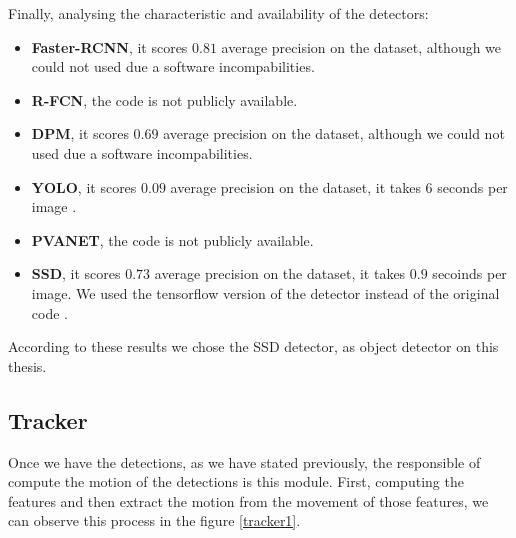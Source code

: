 \documentclass[12pt, a4paper, titlepage,twoside,openright]{article}
\begin{document}

Finally, analysing the characteristic and availability of the detectors:

\begin{itemize}

\item \textbf{Faster-RCNN}, it scores $0.81$ average precision on the dataset, although we could not used due a software incompabilities.

\item \textbf{R-FCN}, the code is not publicly available.

\item \textbf{DPM}, it scores $0.69$ average precision on the dataset, although we could not used due a software incompabilities.

\item \textbf{YOLO}, it scores $0.09$ average precision on the dataset, it takes $6$ seconds per image \cite{yoloDark}. 

\item \textbf{PVANET}, the code is not publicly available.

\item \textbf{SSD}, it scores $0.73$ average precision on the dataset, it takes $0.9$ secoinds per image. We used the tensorflow version of the detector \cite{ssdCode} instead of the original code \cite{ssdCode2}.


\end{itemize}

According to these results we chose the SSD detector, as object detector on this thesis.


\subsection{Tracker}

Once we have the detections, as we have stated previously, the responsible of compute the motion of the detections is this module. First, computing the features and then extract the motion from the movement of those features, we can observe this process in the figure \ref{tracker1}.
\end{document}
